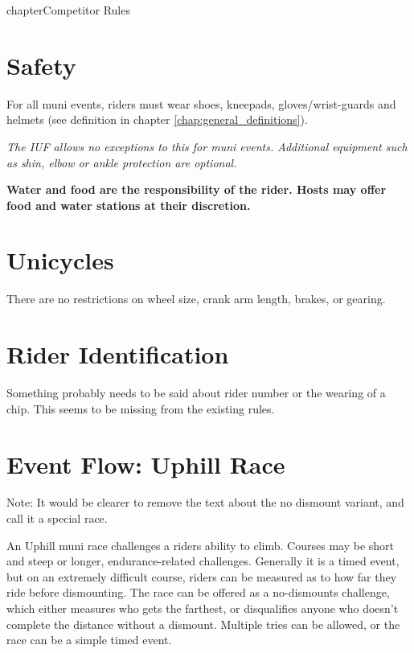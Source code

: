 chapter{Competitor Rules}

\section{Safety}
For all muni events, riders must wear shoes, kneepads, gloves/wrist-guards and helmets (see definition in chapter \ref{chap:general_definitions}).

\textit{The IUF allows no exceptions to this for muni events. Additional equipment such as shin, elbow or ankle protection are optional.}

\textbf{Water and food are the responsibility of the rider. Hosts may offer food and water stations at their discretion.}

\section{Unicycles}

There are no restrictions on wheel size, crank arm length, brakes, or gearing.

\section{Rider Identification}

\begin{framed}
Something probably needs to be said about rider number or the wearing of a chip.  This seems to be missing from the existing rules.
\end{framed}

\section{Event Flow: Uphill Race \label{sec:muni_uphill}}

\begin{framed}
Note: It would be clearer to remove the text about the no dismount variant, and call it a special race.
\end{framed}

An Uphill muni race challenges a riders ability to climb.
Courses may be short and steep or longer, endurance-related challenges. 
Generally it is a timed event, but on an extremely difficult course, riders can be measured as to how far they ride before dismounting.
The race can be offered as a no-dismounts challenge, which either measures who gets the farthest, or disqualifies anyone who doesn't complete the distance without a dismount.
Multiple tries can be allowed, or the race can be a simple timed event.

